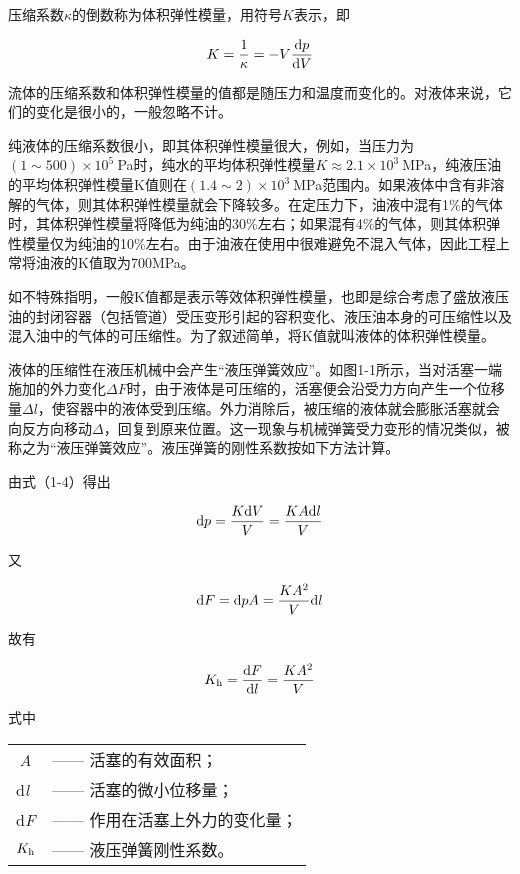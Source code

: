 压缩系数$\kappa $的倒数称为体积弹性模量，用符号$\mathit{K}$表示，即

\begin{equation}
    K=\frac{1}{\kappa }=-V\frac{{\rm d}p}{{\rm d}V}
\end{equation}

流体的压缩系数和体积弹性模量的值都是随压力和温度而变化的。对液体来说，它们的变化是很小的，一般忽略不计。

纯液体的压缩系数很小，即其体积弹性模量很大，例如，当压力为$(1\sim 500)\times 10^5\ $Pa时，纯水的平均体积弹性模量$K\approx 2.1\times 10^3\ $MPa，纯液压油的平均体积弹性模量K值则在$(1.4\sim 2)\times 10^3\ $MPa范围内。如果液体中含有非溶解的气体，则其体积弹性模量就会下降较多。在定压力下，油液中混有1$\%$的气体时，其体积弹性模量将降低为纯油的30$\%$左右；如果混有4$\%$的气体，则其体积弹性模量仅为纯油的10$\%$左右。由于油液在使用中很难避免不混入气体，因此工程上常将油液的K值取为700MPa。

如不特殊指明，一般K值都是表示等效体积弹性模量，也即是综合考虑了盛放液压油的封闭容器（包括管道）受压变形引起的容积变化、液压油本身的可压缩性以及混入油中的气体的可压缩性。为了叙述简单，将K值就叫液体的体积弹性模量。

液体的压缩性在液压机械中会产生“液压弹簧效应”。如图1-1所示，当对活塞一端施加的外力变化$\Delta F$时，由于液体是可压缩的，活塞便会沿受力方向产生一个位移量$\Delta l$，使容器中的液体受到压缩。外力消除后，被压缩的液体就会膨胀活塞就会向反方向移动$\Delta $，回复到原来位置。这一现象与机械弹簧受力变形的情况类似，被称之为“液压弹簧效应”。液压弹簧的刚性系数按如下方法计算。

由式（1-4）得出

$${\rm d}p=\frac{K{\rm d}V}{V}=\frac{KA{\rm d}l}{V}$$

\noindent 又

$${\rm d}F={\rm d}pA=\frac{KA^2}{V}{\rm d}l$$

\noindent 故有

\begin{equation}
    K_{\rm h}=\frac{{\rm d}F}{{\rm d}l}=\frac{KA^2}{V}
\end{equation}

\noindent 式中\quad %
\begin{tabular}[t]{p{1mm}l}
    $\ $\textit{A} &—— 活塞的有效面积；\\
    d\textit{l} &—— 活塞的微小位移量；\\
    d\textit{F} &—— 作用在活塞上外力的变化量；\\
    $K_{\rm h}$ &—— 液压弹簧刚性系数。
\end{tabular}


